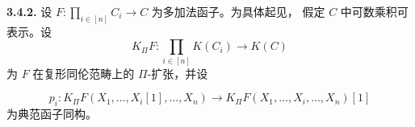 \noindent\textbf{3.4.2.}\quad
{}
设 $F\colon\prod_{i\in[n]}C_i\longrightarrow C$ 为多加法函子。为具体起见，
假定 $C$ 中可数乘积可表示。设
\[
  K_{\Pi}F\colon\prod_{i\in[n]}K(C_i)\longrightarrow K(C)
\]
为 $F$ 在复形同伦范畴上的 $\Pi$-扩张，并设

\[
  p_i\colon K_{\Pi}F(X_1,\ldots,X_i[1],\ldots,X_n)
  \longrightarrow K_{\Pi}F(X_1,\ldots,X_i,\ldots,X_n)[1]
\]
为典范函子同构。
\endgroup
